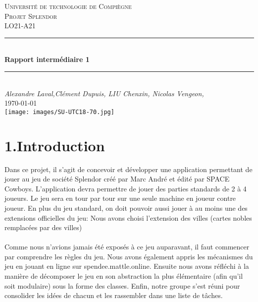 \documentclass[a4paper]{article}
\begin{document}
\begin{titlepage}

\newcommand{\HRule}{\rule{\linewidth}{0.5mm}} 							%
\center 
 
\textsc{\LARGE Université de technologie de Compiègne}\\[1cm]

\textsc{\Large Projet Splendor}\\[0.2cm]
\textsc{\large LO21-A21}\\[1cm] 										%
\HRule \\[0.8cm]
{ \huge \bfseries Rapport intermédiaire 1}\\[0.7cm]								%
\HRule \\[2cm]
\large
\emph{Alexandre Laval,Clément Dupuis, LIU Chenxin, Nicolas Vengeon,  }\\
{\large \today}\\[13cm]
\texttt{[image: images/SU-UTC18-70.jpg]}\\[1cm] 	%
\vfill 
\end{titlepage}


\section*{1.Introduction}

Dans ce projet, il s’agit de concevoir et développer une application permettant de jouer au jeu de 
société Splendor créé par Marc André et édité par SPACE Cowboys. 
L’application devra permettre de jouer des parties standards de 2 à 4 joueurs. Le jeu sera en tour par tour sur une seule machine en joueur contre joueur. En plus du jeu standard, on doit pouvoir aussi jouer
à au moins une des extensions officielles du jeu: Nous avons choisi l'extension des villes (cartes nobles remplacées par des villes)\\
\\
Comme nous n'avions jamais été exposés à ce jeu auparavant, il faut commencer par comprendre les règles du jeu. 
Nous avons également appris les mécanismes du jeu en jouant en ligne sur spendee.mattle.online.
Ensuite nous avons réfléchi à la manière de décomposer le jeu en son abstraction la plus élémentaire 
(afin qu'il soit modulaire) sous la forme des classes. 
Enfin, notre groupe s'est réuni pour consolider les idées de chacun et les rassembler dans une liste de tâches.
\end{document}
